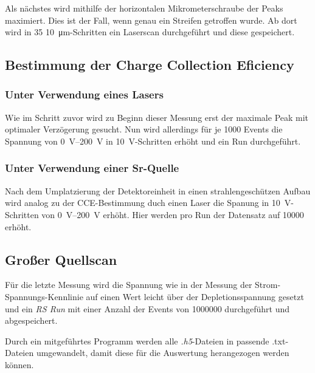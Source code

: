 Als nächstes wird mithilfe der horizontalen Mikrometerschraube der Peaks maximiert.
Dies ist der Fall, wenn genau ein Streifen getroffen wurde. Ab dort wird in \num{35}
\SI{10}{\micro\meter}-Schritten ein Laserscan durchgeführt und diese gespeichert.


\subsection{Bestimmung der Charge Collection Eficiency}
\label{sec:CCE}
\subsubsection{Unter Verwendung eines Lasers}
Wie im Schritt zuvor wird zu Beginn dieser Messung erst der maximale Peak mit
optimaler Verzögerung gesucht. Nun wird allerdings für je \num{1000} Events die
Spannung von \SIrange{0}{200}{\volt} in \SI{10}{\volt}-Schritten erhöht und ein
Run durchgeführt.

\subsubsection{Unter Verwendung einer Sr-Quelle}
Nach dem Umplatzierung der Detektoreinheit in einen strahlengeschützen Aufbau wird
analog zu der CCE-Bestimmung duch einen Laser die Spanung in \SI{10}{\volt}-Schritten
von \SIrange{0}{200}{\volt} erhöht. Hier werden pro Run der Datensatz auf \num{10000}
erhöht.

\subsection{Großer Quellscan}
\label{sec:Quellscan}
Für die letzte Messung wird die Spannung wie in der Messung der Strom-Spannungs-Kennlinie
auf einen Wert leicht über der Depletionsspannung gesetzt und ein \textit{RS Run} mit
einer Anzahl der Events von \num{1000000} durchgeführt und abgespeichert.

Durch ein mitgeführtes Programm werden alle \textit{.h5}-Dateien in passende .txt-Dateien umgewandelt, damit diese für die Auswertung herangezogen werden können.
